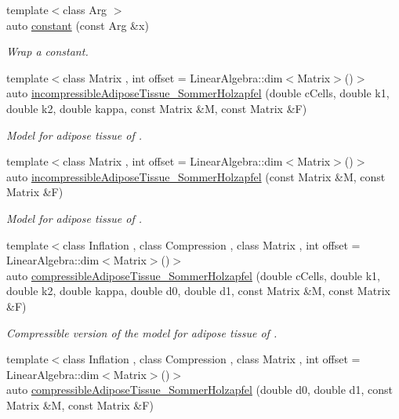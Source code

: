 \begin{DoxyCompactItemize}
{\footnotesize template$<$class Arg $>$ }\\auto \hyperlink{namespaceFunG_a65c509062b62b3303268cabc97b75a65}{constant} (const Arg \&x)
\begin{DoxyCompactList}\small\item\em Wrap a constant. \end{DoxyCompactList}\item 
{\footnotesize template$<$class Matrix , int offset = Linear\-Algebra\-::dim$<$\-Matrix$>$()$>$ }\\auto \hyperlink{group__Biomechanics_gac269eefc1abb994044e1634c20a98061}{incompressible\-Adipose\-Tissue\-\_\-\-Sommer\-Holzapfel} (double c\-Cells, double k1, double k2, double kappa, const Matrix \&M, const Matrix \&F)
\begin{DoxyCompactList}\small\item\em Model for adipose tissue of \cite{Sommer2013}. \end{DoxyCompactList}\item 
{\footnotesize template$<$class Matrix , int offset = Linear\-Algebra\-::dim$<$\-Matrix$>$()$>$ }\\auto \hyperlink{group__Biomechanics_ga01ab128bcf179f4431b0270179af9e20}{incompressible\-Adipose\-Tissue\-\_\-\-Sommer\-Holzapfel} (const Matrix \&M, const Matrix \&F)
\begin{DoxyCompactList}\small\item\em Model for adipose tissue of \cite{Sommer2013}. \end{DoxyCompactList}\item 
{\footnotesize template$<$class Inflation , class Compression , class Matrix , int offset = Linear\-Algebra\-::dim$<$\-Matrix$>$()$>$ }\\auto \hyperlink{group__Biomechanics_ga5c3388564c0420b62e58f48c739d27f1}{compressible\-Adipose\-Tissue\-\_\-\-Sommer\-Holzapfel} (double c\-Cells, double k1, double k2, double kappa, double d0, double d1, const Matrix \&M, const Matrix \&F)
\begin{DoxyCompactList}\small\item\em Compressible version of the model for adipose tissue of \cite{Sommer2013}. \end{DoxyCompactList}\item 
{\footnotesize template$<$class Inflation , class Compression , class Matrix , int offset = Linear\-Algebra\-::dim$<$\-Matrix$>$()$>$ }\\auto \hyperlink{group__Biomechanics_ga27bb3f7c579ce8c21a69ea4d4d0169d7}{compressible\-Adipose\-Tissue\-\_\-\-Sommer\-Holzapfel} (double d0, double d1, const Matrix \&M, const Matrix \&F)

\end{DoxyCompactItemize}
